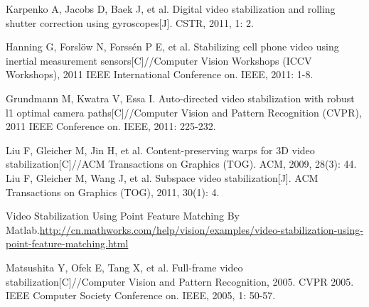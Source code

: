 \documentclass[journal, a4paper]{IEEEtran}
\begin{document}
\begin{thebibliography}{5}

Karpenko A, Jacobs D, Baek J, et al. Digital video stabilization and rolling shutter correction using gyroscopes[J]. CSTR, 2011, 1: 2.

    Hanning G, Forslöw N, Forssén P E, et al. Stabilizing cell phone video using inertial measurement sensors[C]//Computer Vision Workshops (ICCV Workshops), 2011 IEEE International Conference on. IEEE, 2011: 1-8.
    
    Grundmann M, Kwatra V, Essa I. Auto-directed video stabilization with robust l1 optimal camera paths[C]//Computer Vision and Pattern Recognition (CVPR), 2011 IEEE Conference on. IEEE, 2011: 225-232.
    
    Liu F, Gleicher M, Jin H, et al. Content-preserving warps for 3D video stabilization[C]//ACM Transactions on Graphics (TOG). ACM, 2009, 28(3): 44.
    Liu F, Gleicher M, Wang J, et al. Subspace video stabilization[J]. ACM Transactions on Graphics (TOG), 2011, 30(1): 4.
    
    Video Stabilization Using Point Feature Matching By Matlab.\url{http://cn.mathworks.com/help/vision/examples/video-stabilization-using-point-feature-matching.html}
    
    Matsushita Y, Ofek E, Tang X, et al. Full-frame video stabilization[C]//Computer Vision and Pattern Recognition, 2005. CVPR 2005. IEEE Computer Society Conference on. IEEE, 2005, 1: 50-57.
    

\end{thebibliography}

\end{document}
